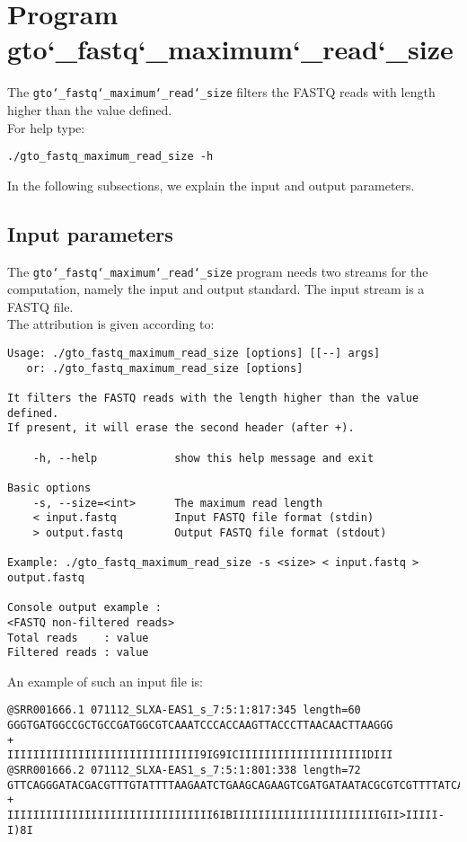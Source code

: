 \section{Program gto\char`_fastq\char`_maximum\char`_read\char`_size}
The \texttt{gto\char`_fastq\char`_maximum\char`_read\char`_size} filters the FASTQ reads with length higher than the value defined.\\
For help type:
\begin{lstlisting}
./gto_fastq_maximum_read_size -h
\end{lstlisting}
In the following subsections, we explain the input and output parameters.

\subsection*{Input parameters}

The \texttt{gto\char`_fastq\char`_maximum\char`_read\char`_size} program needs two streams for the computation, namely the input and output standard. The input stream is a FASTQ file.\\
The attribution is given according to:
\begin{lstlisting}
Usage: ./gto_fastq_maximum_read_size [options] [[--] args]
   or: ./gto_fastq_maximum_read_size [options]

It filters the FASTQ reads with the length higher than the value defined. 
If present, it will erase the second header (after +).

    -h, --help            show this help message and exit

Basic options
    -s, --size=<int>      The maximum read length
    < input.fastq         Input FASTQ file format (stdin)
    > output.fastq        Output FASTQ file format (stdout)

Example: ./gto_fastq_maximum_read_size -s <size> < input.fastq > output.fastq

Console output example :
<FASTQ non-filtered reads>
Total reads    : value
Filtered reads : value
\end{lstlisting}
An example of such an input file is:
\begin{lstlisting}
@SRR001666.1 071112_SLXA-EAS1_s_7:5:1:817:345 length=60
GGGTGATGGCCGCTGCCGATGGCGTCAAATCCCACCAAGTTACCCTTAACAACTTAAGGG
+
IIIIIIIIIIIIIIIIIIIIIIIIIIIIII9IG9ICIIIIIIIIIIIIIIIIIIIIDIII
@SRR001666.2 071112_SLXA-EAS1_s_7:5:1:801:338 length=72
GTTCAGGGATACGACGTTTGTATTTTAAGAATCTGAAGCAGAAGTCGATGATAATACGCGTCGTTTTATCAT
+
IIIIIIIIIIIIIIIIIIIIIIIIIIIIIIII6IBIIIIIIIIIIIIIIIIIIIIIIIGII>IIIII-I)8I
\end{lstlisting}

